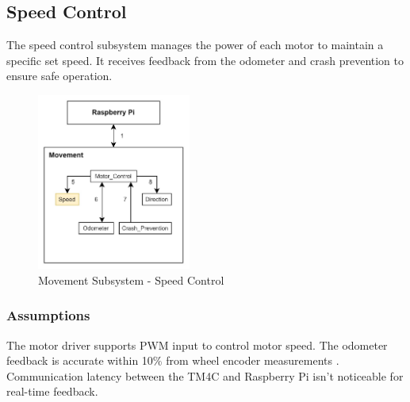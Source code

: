 

\subsection{Speed Control}
The speed control subsystem manages the power of each motor to maintain a specific set speed. It receives feedback from the odometer and crash prevention to ensure safe operation.

\begin{figure}[h!]
	\centering
 	\includegraphics[width=0.45\textwidth]{images/movement/speed.jpg}
 \caption{Movement Subsystem - Speed Control} %
\end{figure}

\subsubsection{Assumptions}
The motor driver supports PWM input to control motor speed. The odometer feedback is accurate within 10\% from wheel encoder measurements \cite{Zhang2020}. Communication latency between the TM4C and Raspberry Pi isn't noticeable for real-time feedback.


